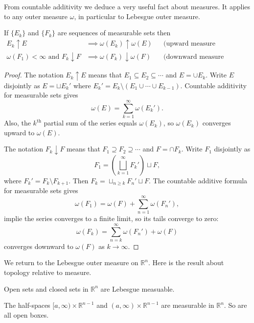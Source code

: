 \documentclass[11pt]{article}
\begin{document}
From countable additivity we deduce a very useful fact about measures.  It applies to any outer measure $\omega$, in particular to Lebesgue outer measure.

\begin{thm}
  If $\{E_k\}$ and $\{F_k\}$ are sequences of measurable sets then
  \begin{align*}
    E_k \uparrow E &\implies \omega(E_k) \uparrow \omega(E) & &\text{(upward measure continuity)} \\
    \omega(F_1) < \infty \text{ and } F_k \downarrow F &\implies \omega(F_k) \downarrow \omega(F) & &\text{(downward measure continuity)}
  \end{align*}
\end{thm}

\begin{proof}
  The notation $E_k \uparrow E$ means that $E_1 \subseteq E_2 \subseteq \cdots$ and $E = \cup E_k$.  Write $E$ disjointly as $E = \sqcup E_k'$ where $E_k' = E_k \setminus (E_1 \cup \cdots \cup E_{k-1})$.  Countable additivity for measurable sets gives
  \[
    \omega(E) = \sum_{k=1}^\infty \omega(E_k').
  \]
  Also, the $k^{\text{th}}$ partial sum of the series equals $\omega(E_k)$, so $\omega(E_k)$ converges upward to $\omega(E)$.

  The notation $F_k \downarrow F$ means that $F_1 \supseteq F_2 \supseteq \cdots$ and $F = \cap F_k$.  Write $F_1$ disjointly as
  \[
    F_1 = \left( \bigsqcup_{k=1}^\infty F_k' \right) \sqcup F,
  \]
  where $F_k' = F_k \setminus F_{k+1}$.  Then $F_k = \sqcup_{n \geqslant k} F_n' \sqcup F$.  The countable additive formula for measurable sets gives
  \[
    \omega(F_1) = \omega(F) + \sum_{n=1}^\infty \omega(F_n'),
  \]
  implie the series converges to a finite limit, so its tails converge to zero:
  \[
    \omega(F_k) = \sum_{n=k}^\infty \omega(F_n') + \omega(F)
  \]
  converges downward to $\omega(F)$ as $k \to \infty$.
\end{proof}

We return to the Lebesgue outer measure on $\mathbb{R}^n$.  Here is the result about topology relative to measure.

\begin{thm}
  \label{thm:topology-measurable}
  Open sets and closed sets in $\mathbb{R}^n$ are Lebesgue measuable.
\end{thm}

\begin{prop}
  The half-spaces $[a,\infty) \times \mathbb{R}^{n-1}$ and $(a,\infty) \times \mathbb{R}^{n-1}$ are measurable in $\mathbb{R}^n$.  So are all open boxes.
\end{prop}
\end{document}
